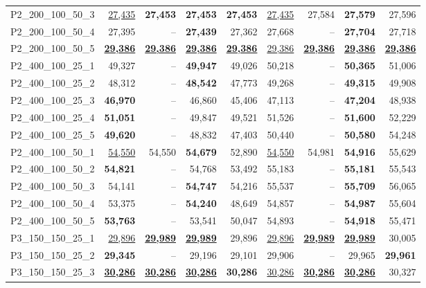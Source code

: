 \documentclass[smallextended]{svjour3}       %
\begin{document}
\begin{table}
\begin{tabular}{lrrrrrrrr}
P2\_200\_100\_50\_3 & \underline{27,435} & \textbf{27,453} & \textbf{27,453} & \textbf{27,453} & \underline{27,435} & 27,584 & \textbf{27,579} & 27,596 \\
P2\_200\_100\_50\_4 & 27,395 & -- & \textbf{27,439} & 27,362 & 27,668 & -- & \textbf{27,704} & 27,718 \\
P2\_200\_100\_50\_5 & \underline{\textbf{29,386}} & \underline{\textbf{29,386}} & \underline{\textbf{29,386}} & \underline{\textbf{29,386}} & \underline{29,386} & \underline{\textbf{29,386}} & \underline{\textbf{29,386}} & \underline{\textbf{29,386}} \\
P2\_400\_100\_25\_1 & 49,327 & -- & \textbf{49,947} & 49,026 & 50,218 & -- & \textbf{50,365} & 51,006 \\
P2\_400\_100\_25\_2 & 48,312 & -- & \textbf{48,542} & 47,773 & 49,268 & -- & \textbf{49,315} & 49,908 \\
P2\_400\_100\_25\_3 & \textbf{46,970} & -- & 46,860 & 45,406 & 47,113 & -- & \textbf{47,204} & 48,938 \\
P2\_400\_100\_25\_4 & \textbf{51,051} & -- & 49,847 & 49,521 & 51,526 & -- & \textbf{51,600} & 52,229 \\
P2\_400\_100\_25\_5 & \textbf{49,620} & -- & 48,832 & 47,403 & 50,440 & -- & \textbf{50,580} & 54,248 \\
P2\_400\_100\_50\_1 & \underline{54,550} & 54,550 & \textbf{54,679} & 52,890 & \underline{54,550} & 54,981 & \textbf{54,916} & 55,629 \\
P2\_400\_100\_50\_2 & \textbf{54,821} & -- & 54,768 & 53,492 & 55,183 & -- & \textbf{55,181} & 55,543 \\
P2\_400\_100\_50\_3 & 54,141 & -- & \textbf{54,747} & 54,216 & 55,537 & -- & \textbf{55,709} & 56,065 \\
P2\_400\_100\_50\_4 & 53,375 & -- & \textbf{54,240} & 48,649 & 54,857 & -- & \textbf{54,987} & 55,604 \\
P2\_400\_100\_50\_5 & \textbf{53,763} & -- & 53,541 & 50,047 & 54,893 & -- & \textbf{54,918} & 55,471 \\
P3\_150\_150\_25\_1 & \underline{29,896} & \underline{\textbf{29,989}} & \underline{\textbf{29,989}} & 29,896 & \underline{29,896} & \underline{\textbf{29,989}} & \underline{\textbf{29,989}} & 30,005 \\
P3\_150\_150\_25\_2 & \textbf{29,345} & -- & 29,196 & 29,101 & 29,906 & -- & 29,965 & \textbf{29,961} \\
P3\_150\_150\_25\_3 & \underline{\textbf{30,286}} & \underline{\textbf{30,286}} & \underline{\textbf{30,286}} & \textbf{30,286} & \underline{30,286} & \underline{\textbf{30,286}} & \underline{\textbf{30,286}} & 30,327 \\

\end{tabular}
\end{table}
\end{document}
